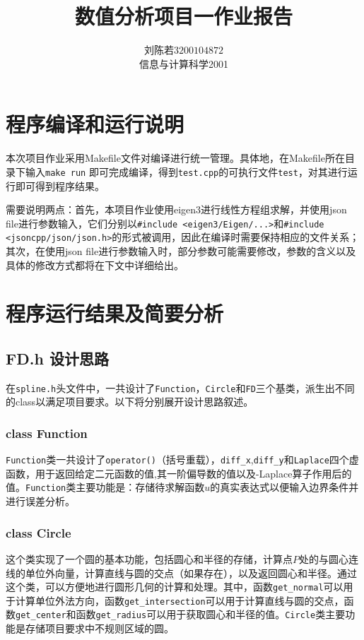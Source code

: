 \documentclass{ctexart}
\begin{document}
\begin{sloppypar}
\title{\vspace{-3cm} \textbf{数值分析项目一作业报告}}
\author{刘陈若\;$3200104872$\\信息与计算科学2001}
\date{}

\maketitle

\section{程序编译和运行说明}
本次项目作业采用Makefile文件对编译进行统一管理。具体地，在Makefile所在目录下输入\verb|make run|
即可完成编译，得到\verb|test.cpp|的可执行文件\verb|test|，对其进行运行即可得到程序结果。

需要说明两点：首先，本项目作业使用eigen3进行线性方程组求解，并使用json file进行参数输入，它们分别以\verb|#include <eigen3/Eigen/...>|和\verb|#include <jsoncpp/json/json.h>|的形式被调用，因此在编译时需要保持相应的文件关系；其次，在使用json file进行参数输入时，部分参数可能需要修改，参数的含义以及具体的修改方式都将在下文中详细给出。

\section{程序运行结果及简要分析}
\subsection{FD.h 设计思路}
在\verb|spline.h|头文件中，一共设计了\verb|Function|，\verb|Circle|和\verb|FD|三个基类，派生出不同的class以满足项目要求。以下将分别展开设计思路叙述。
\subsubsection{class Function}
\verb|Function|类一共设计了\verb|operator()|（括号重载），\verb|diff_x|,\verb|diff_y|和\verb|Laplace|四个虚函数，用于返回给定二元函数的值,其一阶偏导数的值以及-Laplace算子作用后的值。\verb|Function|类主要功能是：存储待求解函数$u$的真实表达式以便输入边界条件并进行误差分析。

\subsubsection{class Circle}

这个类实现了一个圆的基本功能，包括圆心和半径的存储，计算点$P$处的与圆心连线的单位外向量，计算直线与圆的交点（如果存在），以及返回圆心和半径。通过这个类，可以方便地进行圆形几何的计算和处理。其中，函数\verb|get_normal|可以用于计算单位外法方向，函数\verb|get_intersection|可以用于计算直线与圆的交点，函数\verb|get_center|和函数\verb|get_radius|可以用于获取圆心和半径的值。\verb|Circle|类主要功能是存储项目要求中不规则区域的圆。


\end{sloppypar}
\end{document}
